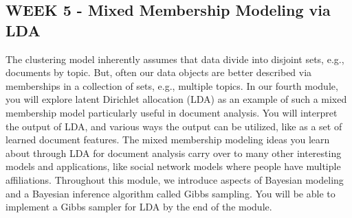 \subsection*{WEEK 5 - Mixed Membership Modeling via LDA}
The clustering model inherently assumes that data divide into disjoint sets, e.g., documents by topic. But, often our data objects are better described via memberships in a collection of sets, e.g., multiple topics. In our fourth module, you will explore latent Dirichlet allocation (LDA) as an example of such a mixed membership model particularly useful in document analysis. You will interpret the output of LDA, and various ways the output can be utilized, like as a set of learned document features. The mixed membership modeling ideas you learn about through LDA for document analysis carry over to many other interesting models and applications, like social network models where people have multiple affiliations.
Throughout this module, we introduce aspects of Bayesian modeling and a Bayesian inference algorithm called Gibbs sampling. You will be able to implement a Gibbs sampler for LDA by the end of the module.

